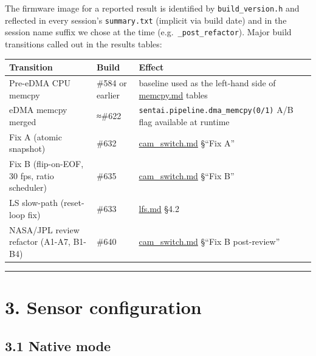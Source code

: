 The firmware image for a reported result is identified by
\texttt{build\_version.h} and reflected in every session's
\texttt{summary.txt} (implicit via build date) and in the session name
suffix we chose at the time (e.g.~\texttt{\_post\_refactor}). Major
build transitions called out in the results tables:

{\def\LTcaptype{none} %
\begin{longtable}[]{@{}
  >{\raggedright\arraybackslash}p{}
  >{\raggedright\arraybackslash}p{}
  >{\raggedright\arraybackslash}p{}@{}}
\toprule\noalign{}
\begin{minipage}[b]{\linewidth}\raggedright
Transition
\end{minipage} & \begin{minipage}[b]{\linewidth}\raggedright
Build
\end{minipage} & \begin{minipage}[b]{\linewidth}\raggedright
Effect
\end{minipage} \\
\midrule\noalign{}
\endhead
\bottomrule\noalign{}
\endlastfoot
Pre-eDMA CPU memcpy & \#584 or earlier & baseline used as the left-hand
side of \url{memcpy.md} tables \\
eDMA memcpy merged & ≈\#622 & \texttt{sentai.pipeline.dma\_memcpy(0/1)}
A/B flag available at runtime \\
Fix A (atomic snapshot) & \#632 & \url{cam_switch.md} §``Fix A'' \\
Fix B (flip-on-EOF, 30 fps, ratio scheduler) & \#635 &
\url{cam_switch.md} §``Fix B'' \\
LS slow-path (reset-loop fix) & \#633 & \url{lfs.md} §4.2 \\
NASA/JPL review refactor (A1-A7, B1-B4) & \#640 & \url{cam_switch.md}
§``Fix B post-review'' \\
\end{longtable}
}

\begin{center}\rule{0.5\linewidth}{0.5pt}\end{center}

\section{3. Sensor configuration}\label{sensor-configuration}

\subsection{3.1 Native mode}\label{native-mode}

